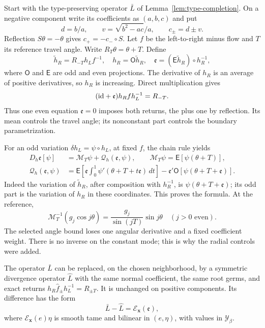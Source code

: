 Start with the type-preserving operator $\bar L$ of
Lemma~\ref{lem:type-completion}. On a negative component write its
coefficients as $(a,b,c)$ and put
\[
 d=b/a,\qquad v=\sqrt{b^2-ac}/a,\qquad c_\pm=d\pm v.
\]
Reflection $S\theta=-\theta$ gives $c_+=-c_-\circ S$.
Let $f$ be the left-to-right minus flow and $T$ its reference travel
angle. Write $R_T\theta=\theta+T$. Define
\begin{equation}\label{eq:full-height-one-chart}
 \widetilde h_R=R_{-T}h_Lf^{-1},\quad
 h_R=\mathsf O\widetilde h_R,\quad
 \mathfrak e=(\mathsf E\widetilde h_R)\circ h_R^{-1},
\end{equation}
where $\mathsf O$ and $\mathsf E$ are odd and even projections.
The derivative of $h_R$ is an average of positive derivatives, so
$h_R$ is increasing. Direct multiplication gives
\[
 (\mathrm{id}+\mathfrak e)h_Rfh_L^{-1}=R_{-T}.
\]
Thus one even equation $\mathfrak e=0$ imposes both returns, the plus
one by reflection. Its mean controls the travel angle; its nonconstant
part controls the boundary parametrization.

For an odd variation $\delta h_L=\psi\circ h_L$, at fixed $f$, the
chain rule yields
\begin{equation}\label{eq:full-height-chart-derivative}
 \begin{split}
 D_h\mathfrak e[\psi]&=\mathcal M_T\psi+\mathcal Q_h(\mathfrak e,\psi),\qquad
 \mathcal M_T\psi=\mathsf E[\psi(\theta+T)],\\
 \mathcal Q_h(\mathfrak e,\psi)&=
 \mathsf E\left[\mathfrak e\int_0^1
       \psi'(\theta+T+t\mathfrak e)\,dt\right]
 -\mathfrak e'\mathsf O[\psi(\theta+T+\mathfrak e)].
 \end{split}
\end{equation}
Indeed the variation of $\widetilde h_R$, after composition with
$h_R^{-1}$, is $\psi(\theta+T+\mathfrak e)$; its odd part is the
variation of $h_R$ in these coordinates. This proves the formula.
At the reference,
\begin{equation}\label{eq:rewrite-circle-inverse}
 \mathcal M_T^{-1}(g_j\cos j\theta)
       =\frac{g_j}{\sin(jT)}\sin j\theta\quad(j>0\text{ even}).
\end{equation}
The selected angle bound loses one angular derivative and a fixed
coefficient weight. There is no inverse on the constant mode; this
is why the radial controls were added.

\begin{proposition}
\label{prop:optical-residual-completion}
The operator $\bar L$ can be replaced, on the chosen neighborhood,
by a symmetric divergence operator $\widehat L$ with the same normal
coefficient, the same root germs, and exact returns
$h_R\widehat f_\pm h_L^{-1}=R_{\pm T}$. It is unchanged on positive
components. Its difference has the form
\begin{equation}\label{eq:optical-residual-completion}
 \bar L-\widehat L=\mathscr E_{\mathbf x}(\mathfrak e),
\end{equation}
where $\mathscr E_{\mathbf x}(e)\eta$ is smooth tame and bilinear
in $(e,\eta)$, with values in $\mathcal Y_\beta$.
\end{proposition}


